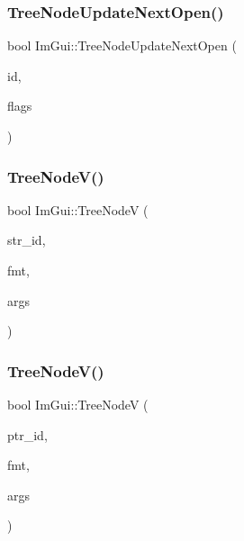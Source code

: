 \mbox{\label{namespaceImGui_a75b8642d7b115fa42a211bc31f395665}} 
\subsubsection{\texorpdfstring{Tree\+Node\+Update\+Next\+Open()}{TreeNodeUpdateNextOpen()}}
{\footnotesize\ttfamily bool Im\+Gui\+::\+Tree\+Node\+Update\+Next\+Open (\begin{DoxyParamCaption}\item[{Im\+Gui\+ID}]{id,  }\item[{Im\+Gui\+Tree\+Node\+Flags}]{flags }\end{DoxyParamCaption})}

\mbox{\label{namespaceImGui_a9bc1075c583973d76d8d65ea89787453}} 
\subsubsection{\texorpdfstring{Tree\+Node\+V()}{TreeNodeV()}\hspace{0.1cm}{\footnotesize\ttfamily [1/2]}}
{\footnotesize\ttfamily bool Im\+Gui\+::\+Tree\+NodeV (\begin{DoxyParamCaption}\item[{const char $\ast$}]{str\+\_\+id,  }\item[{const char $\ast$}]{fmt,  }\item[{va\+\_\+list}]{args }\end{DoxyParamCaption})}

\mbox{\label{namespaceImGui_a15320f61ba6b4916af3323bf7844602e}} 
\subsubsection{\texorpdfstring{Tree\+Node\+V()}{TreeNodeV()}\hspace{0.1cm}{\footnotesize\ttfamily [2/2]}}
{\footnotesize\ttfamily bool Im\+Gui\+::\+Tree\+NodeV (\begin{DoxyParamCaption}\item[{const \hyperlink{imgui__impl__opengl3__loader_8h_ac668e7cffd9e2e9cfee428b9b2f34fa7}{void} $\ast$}]{ptr\+\_\+id,  }\item[{const char $\ast$}]{fmt,  }\item[{va\+\_\+list}]{args }\end{DoxyParamCaption})}

